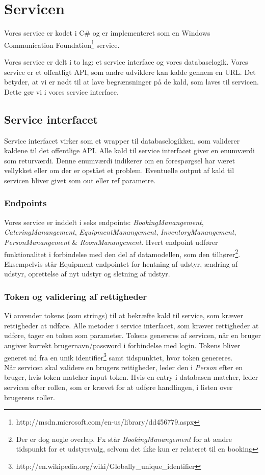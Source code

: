 \section{Servicen}
\label{Technical_Service}
Vores service er kodet i C\# og er implementeret som en Windows Communication Foundation\footnote{http://msdn.microsoft.com/en-us/library/dd456779.aspx} service. 

Vores service er delt i to lag: et service interface og vores databaselogik. Vores service er et offentligt API, som andre udviklere kan kalde gennem en URL. Det betyder, at vi er nødt til at lave begrænsninger på de kald, som laves til servicen. Dette gør vi i vores service interface. 

\subsection{Service interfacet}
\label{Technical_Service_inter}
Service interfacet virker som et wrapper til databaselogikken, som validerer kaldene til det offentlige API. Alle kald til service interfacet giver en enumværdi som returværdi. Denne enumværdi indikerer om en forespørgsel har været vellykket eller om der er opstået et problem. Eventuelle output af kald til servicen bliver givet som out eller ref parametre.

\subsubsection{Endpoints}
\label{Technical_Service_inter_endpoints}
Vores service er inddelt i seks endpoints: \textit{BookingManangement}, \textit{CateringManangement}, \textit{EquipmentManangement}, \textit{InventoryManangement}, \textit{PersonManangement} \& \textit{RoomManangement}. Hvert endpoint udfører funktionalitet i forbindelse med den del af datamodellen, som den tilhører\footnote{Der er dog nogle overlap. Fx står \textit{BookingManangement} for at ændre tidspunkt for et udstyrsvalg, selvom det ikke kun er relateret til en booking}. Eksempelvis står Equipment endpointet for hentning af udstyr, ændring af udstyr, oprettelse af nyt udstyr og sletning af udstyr. 

\subsubsection{Token og validering af rettigheder}
\label{Technical_Service_inter_Token}
Vi anvender tokens (som strings) til at bekræfte kald til service, som kræver rettigheder at udføre. Alle metoder i service interfacet, som kræver rettigheder at udføre, tager en token som parameter. Tokens genereres af servicen, når en bruger angiver korrekt brugernavn/password i forbindelse med login. Tokens bliver generet ud fra en unik identifier\footnote{http://en.wikipedia.org/wiki/Globally\_unique\_identifier} samt tidspunktet, hvor token genereres. 
\\Når servicen skal validere en brugers rettigheder, leder den i \textit{Person} efter en bruger, hvis token matcher input token. Hvis en entry i databasen matcher, leder servicen efter rollen, som er krævet for at udføre handlingen, i listen over brugerens roller.

